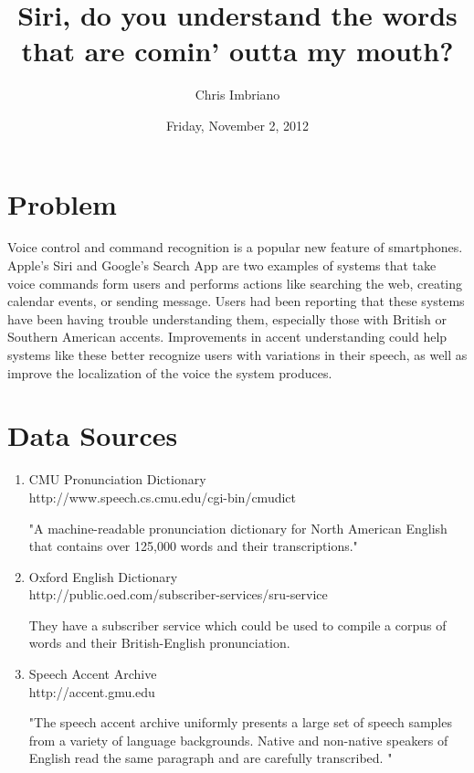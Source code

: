 \documentclass[11pt, letterpaper, oneside]{article}
\author{Chris Imbriano}
\date{Friday, November 2, 2012}
\title{ Siri, do you understand the words \\  that are comin' outta my mouth? }
\begin{document}
\maketitle


%

\section{Problem}
Voice control and command recognition is a popular new feature of smartphones. 
Apple's Siri and Google's Search App are two examples of systems that take voice commands form users and performs actions like searching the web, creating calendar events, or sending message.
Users had been reporting that these systems have been having trouble understanding them, especially those with British or Southern American accents. 
Improvements in accent understanding could help systems like these better recognize users with variations in their speech, as well as improve the localization of the voice the system produces.


\section{Data Sources}
	\begin{enumerate}
		\item CMU Pronunciation Dictionary \\ http://www.speech.cs.cmu.edu/cgi-bin/cmudict
		
		"A machine-readable pronunciation dictionary for North American English that contains over 125,000 words and their transcriptions."
		\item Oxford English Dictionary \\ http://public.oed.com/subscriber-services/sru-service
		
		They have a subscriber service which could be used to compile a corpus of words and their British-English pronunciation.
		\item Speech Accent Archive \\ http://accent.gmu.edu
		
		"The speech accent archive uniformly presents a large set of speech samples from a variety of language backgrounds. 
		Native and non-native speakers of English read the same paragraph and are carefully transcribed. "
	
	
	\end{enumerate}
\end{document}
